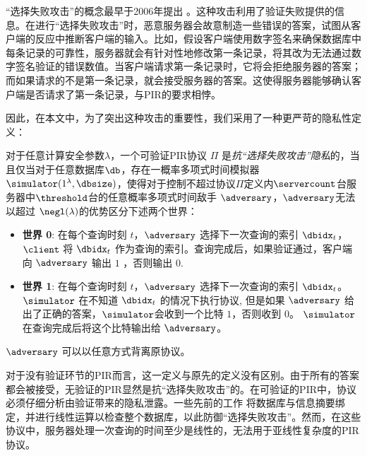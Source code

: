 “选择失败攻击”的概念最早于2006年提出 \cite{Kiraz2006API}。这种攻击利用了验证失败提供的信息。在进行“选择失败攻击”时，恶意服务器会故意制造一些错误的答案，试图从客户端的反应中推断客户端的输入。比如，假设客户端使用数字签名来确保数据库中每条记录的可靠性，服务器就会有针对性地修改第一条记录，将其改为无法通过数字签名验证的错误数值。当客户端请求第一条记录时，它将会拒绝服务器的答案；而如果请求的不是第一条记录，就会接受服务器的答案。这使得服务器能够确认客户端是否请求了第一条记录，与PIR的要求相悖。

因此，在本文中，为了突出这种攻击的重要性，我们采用了一种更严苛的隐私性定义：

\begin{definition}
    \label{def:privacy-sfa}
    对于任意计算安全参数$\lambda$，一个可验证PIR协议 $\Pi$ 是\textit{抗“选择失败攻击”隐私}的，当且仅当对于任意数据库$\db$，存在一概率多项式时间模拟器 $\simulator(1^\lambda, \dbsize)$，使得对于控制不超过协议$\Pi$定义内$\servercount$台服务器中$\threshold$台的任意概率多项式时间敌手 $\adversary$，$\adversary$无法以超过 $\negl(\lambda)$的优势区分下述两个世界：
    \begin{itemize}
        \item \textbf{世界 0}: 在每个查询时刻 $t$，$\adversary$ 选择下一次查询的索引 $\dbidx_t$， $\client$ 将 $\dbidx_t$ 作为查询的索引。查询完成后，如果验证通过，客户端向 $\adversary$ 输出 $1$ ，否则输出 $0$.
        \item \textbf{世界 1}: 在每个查询时刻 $t$，$\adversary$ 选择下一次查询的索引 $\dbidx_t$。$\simulator$ 在不知道  $\dbidx_t$ 的情况下执行协议, 但是如果 $\adversary$ 给出了正确的答案，$\simulator$会收到一个比特 $1$，否则收到 $0$。 $\simulator$ 在查询完成后将这个比特输出给 $\adversary$。
    \end{itemize}

    $\adversary$ 可以以任意方式背离原协议。
\end{definition}

对于没有验证环节的PIR而言，这一定义与原先的定义没有区别。由于所有的答案都会被接受，无验证的PIR显然是抗“选择失败攻击”的。在可验证的PIR中，协议必须仔细分析由验证带来的隐私泄露。一些先前的工作 \cite{APIR, VeriSimplePIR} 将数据库与信息摘要绑定，并进行线性运算以检查整个数据库，以此防御“选择失败攻击”。然而，在这些协议中，服务器处理一次查询的时间至少是线性的，无法用于亚线性复杂度的PIR协议。